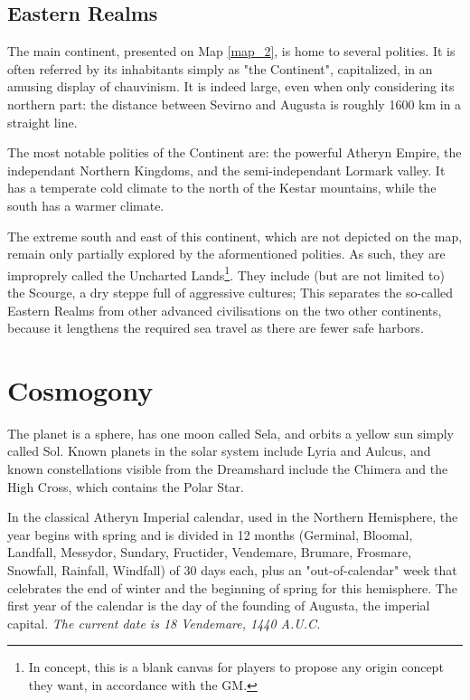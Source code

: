 \subsection{Eastern Realms}

The main continent, presented on Map \ref{map_2}, is home to several polities. It is often referred by its inhabitants simply as "the Continent", capitalized, in an amusing display of chauvinism. It is indeed large, even when only considering its northern part: the distance between Sevirno and Augusta is roughly 1600 km in a straight line.

The most notable polities of the Continent are: the powerful Atheryn Empire, the independant Northern Kingdoms, and the semi-independant Lormark valley. It has a temperate cold climate to the north of the Kestar mountains, while the south has a warmer climate.

The extreme south and east of this continent, which are not depicted on the map, remain only partially explored by the aformentioned polities. As such, they are improprely called the Uncharted Lands\footnote{In concept, this is a blank canvas for players to propose any origin concept they want, in accordance with the GM.}. They include (but are not limited to) the Scourge, a dry steppe full of aggressive cultures; This separates the so-called Eastern Realms from other advanced civilisations on the two other continents, because it lengthens the required sea travel as there are fewer safe harbors.

\section{Cosmogony}

The planet is a sphere, has one moon called Sela, and orbits a yellow sun simply called Sol. Known planets in the solar system include Lyria and Aulcus, and known constellations visible from the Dreamshard include the Chimera and the High Cross, which contains the Polar Star.

In the classical Atheryn Imperial calendar, used in the Northern Hemisphere, the year begins with spring and is divided in 12 months (Germinal, Bloomal, Landfall, Messydor, Sundary, Fructider, Vendemare, Brumare, Frosmare, Snowfall, Rainfall, Windfall) of 30 days each, plus an "out-of-calendar" week that celebrates the end of winter and the beginning of spring for this hemisphere. The first year of the calendar is the day of the founding of Augusta, the imperial capital. \textit{The current date is 18 Vendemare, 1440 A.U.C.}


